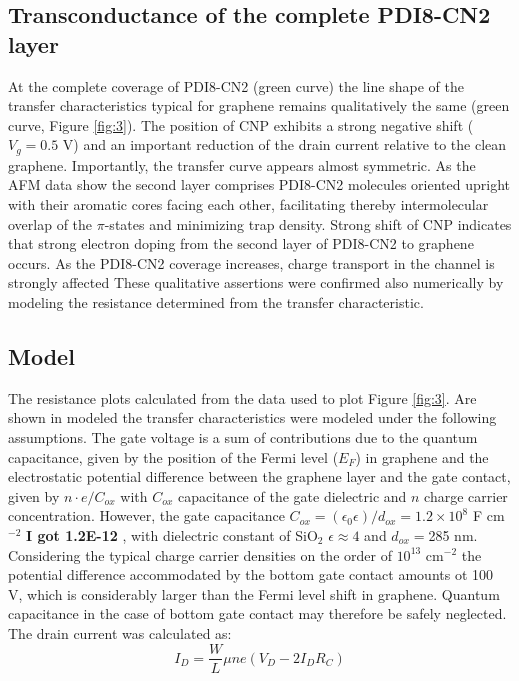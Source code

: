 \documentclass[preprint,aip,jap]{revtex4-2}
\begin{document}
\subsection{Transconductance of the complete PDI8-CN2 layer}
\label{sec:complete}

At the complete coverage of PDI8-CN2 (green curve) the line shape of the transfer characteristics typical for graphene remains qualitatively the same (green curve, Figure \ref{fig:3}).  The position of CNP exhibits a strong negative shift ($V_g=0.5$ V) and an important reduction of the drain current relative to the clean graphene. Importantly, the transfer curve appears almost symmetric.  As the AFM data show the second layer comprises PDI8-CN2 molecules oriented upright with their aromatic cores facing each other, facilitating thereby intermolecular overlap of the $\pi$-states and minimizing trap density.  Strong shift of CNP indicates that strong electron doping from the second layer of PDI8-CN2 to  graphene occurs. As the PDI8-CN2 coverage increases, charge transport in the channel is strongly affected
These qualitative assertions were confirmed also numerically by modeling the resistance determined from the transfer characteristic. 

\subsection{Model}
\label{sec:model}

The resistance plots calculated from the data used to plot Figure \ref{fig:3}.  Are shown in modeled the transfer characteristics were modeled under the following assumptions. The gate voltage is a sum of contributions due to the quantum capacitance, given by the position of the Fermi level  ($E_F$) in graphene and the  electrostatic potential difference between the graphene layer and the gate contact, given by $n\cdot e/C_{ox}$ with $C_{ox}$ capacitance of the gate dielectric and $n$  charge carrier concentration\cite{sze-2006,chhikara-2014}.  However, the gate capacitance $C_{ox}=(\epsilon_0\epsilon)/d_{ox} =1.2\times10^8$ F cm$^{-2}$ \textbf{ I got 1.2E-12 }, with dielectric constant of SiO$_{2}$  $\epsilon \approx 4$ and $d_{ox}=$285 nm.  Considering the typical charge carrier densities on the order of $10^{13}$ cm$^{-2}$ the potential difference accommodated by the bottom gate contact amounts ot 100 V, which is considerably larger than the Fermi level shift in graphene.  Quantum capacitance in the case of bottom gate contact may therefore be safely neglected\cite{das-2008}. The drain current was  calculated as:
\begin{equation}
  \label{eq:2}
  I_{D}=\frac{W}{L}\mu n e(V_{D}- 2I_{D}R_{C})
\end{equation}
\end{document}
